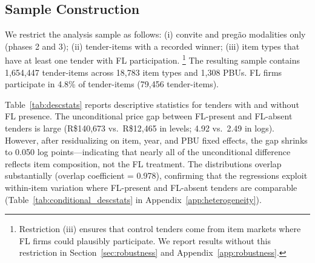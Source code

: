 \subsection{Sample Construction}

We restrict the analysis sample as follows: (i) convite and preg\~ao
modalities only (phases 2 and 3); (ii) tender-items with a recorded
winner; (iii) item types that have at least one tender with FL
participation.%
\footnote{Restriction (iii) ensures that control tenders come from item
markets where FL firms could plausibly participate. We report results
without this restriction in Section~\ref{sec:robustness} and
Appendix~\ref{app:robustness}.}
The resulting sample contains 1,654,447 tender-items across 18,783
item types and 1,308 PBUs. FL firms participate in 4.8\% of
tender-items (79,456 tender-items).

Table~\ref{tab:descstats} reports descriptive statistics for tenders
with and without FL presence. The unconditional price gap between %
FL-present and FL-absent tenders is large (R\$140,673 vs.\ R\$12,465
in levels; 4.92 vs.\ 2.49 in logs). However, after residualizing on
item, year, and PBU fixed effects, the gap shrinks to 0.050 log
points---indicating that nearly all of the unconditional difference
reflects item composition, not the FL treatment. The distributions
overlap substantially (overlap coefficient = 0.978), confirming that
the regressions exploit within-item variation where FL-present and
FL-absent tenders are comparable
(Table~\ref{tab:conditional_descstats} in
Appendix~\ref{app:heterogeneity}).


